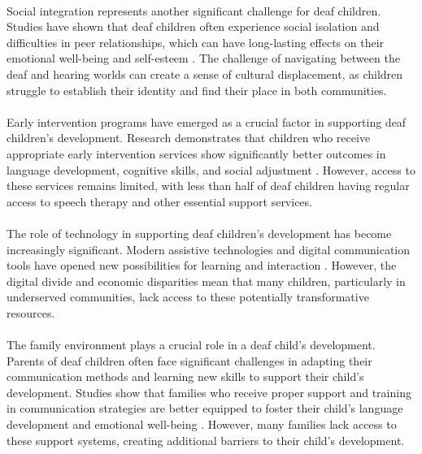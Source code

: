 \paragraph{}
Social integration represents another significant challenge for deaf children. Studies have shown that deaf children often experience social isolation and difficulties in peer relationships, which can have long-lasting effects on their emotional well-being and self-esteem \cite{social_integration2023}. The challenge of navigating between the deaf and hearing worlds can create a sense of cultural displacement, as children struggle to establish their identity and find their place in both communities.

\paragraph{}
Early intervention programs have emerged as a crucial factor in supporting deaf children's development. Research demonstrates that children who receive appropriate early intervention services show significantly better outcomes in language development, cognitive skills, and social adjustment \cite{early_intervention2022}. However, access to these services remains limited, with less than half of deaf children having regular access to speech therapy and other essential support services.

\paragraph{}
The role of technology in supporting deaf children's development has become increasingly significant. Modern assistive technologies and digital communication tools have opened new possibilities for learning and interaction \cite{technology_impact2023}. However, the digital divide and economic disparities mean that many children, particularly in underserved communities, lack access to these potentially transformative resources.

\paragraph{}
The family environment plays a crucial role in a deaf child's development. Parents of deaf children often face significant challenges in adapting their communication methods and learning new skills to support their child's development. Studies show that families who receive proper support and training in communication strategies are better equipped to foster their child's language development and emotional well-being \cite{family_support2022}. However, many families lack access to these support systems, creating additional barriers to their child's development.

